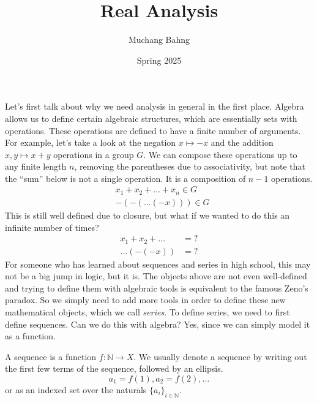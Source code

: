 \documentclass{article}
\begin{document}
\title{Real Analysis}
\author{Muchang Bahng}
\date{Spring 2025}

\maketitle
\tableofcontents
\pagebreak 

  Let's first talk about why we need analysis in general in the first place. Algebra allows us to define certain algebraic structures, which are essentially sets with operations. These operations are defined to have a finite number of arguments. For example, let's take a look at the negation $x \mapsto -x$ and the addition $x, y \mapsto x + y$ operations in a group $G$. We can compose these operations up to any finite length $n$, removing the parentheses due to associativity, but note that the ``sum'' below is not a single operation. It is a composition of $n-1$ operations. 
  \begin{align}
    & x_1 + x_2 + \ldots + x_n \in G  \\
    & -(-(\ldots(-x))) \in G
  \end{align} 
  This is still well defined due to closure, but what if we wanted to do this an infinite number of times? 
  \begin{align}
    x_1 + x_2 + \ldots & = ? \\
    \ldots(-(-x)) & = ? 
  \end{align} 
  For someone who has learned about sequences and series in high school, this may not be a big jump in logic, but it is. The objects above are not even well-defined and trying to define them with algebraic tools is equivalent to the famous Zeno's paradox. So we simply need to add more tools in order to define these new mathematical objects, which we call \textit{series}. To define series, we need to first define sequences. Can we do this with algebra? Yes, since we can simply model it as a function. 

  \begin{definition}[Sequence]
    A sequence is a function $f: \mathbb{N} \rightarrow X$. We usually denote a sequence by writing out the first few terms of the sequence, followed by an ellipsis. 
    \begin{equation}
      a_1 = f(1), a_2 = f(2), \ldots
    \end{equation}
    or as an indexed set over the naturals $\{a_i\}_{i \in \mathbb{N}}$. 
  \end{definition}
\end{document}
